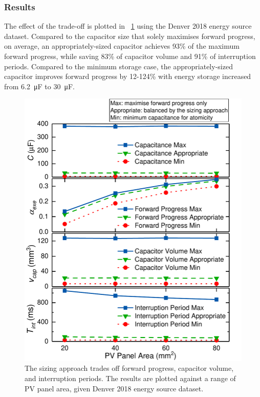 \subsubsection{Results}

The effect of the trade-off is plotted in \figurename{~\ref{fig:tradeoff}} using the Denver 2018 energy source dataset. Compared to the capacitor size that solely maximises forward progress, on average, an appropriately-sized capacitor achieves 93\% of the maximum forward progress, while saving 83\% of capacitor volume and 91\% of interruption periods. Compared to the minimum storage case, the appropriately-sized capacitor improves forward progress by 12-124\% with energy storage increased from \SI{6.2}{\micro\farad} to \SI{30}{\micro\farad}.

\begin{figure}[!t]
    \centering
    \includegraphics[width=0.8\columnwidth]{ch4_sizingapproach/figures/Tradeoff3Fig}
    \caption{The sizing approach trades off forward progress, capacitor volume, and interruption periods. The results are plotted against a range of PV panel area, given Denver 2018 energy source dataset. }
    \label{fig:tradeoff}
\end{figure}

